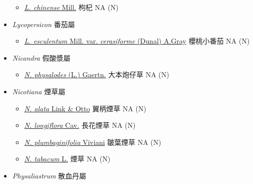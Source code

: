 \begin{itemize}
  \begin{itemize}
        \item[] \href{http://www.theplantlist.org/tpl1.1/search?q=Lycium+chinense}{\textit{L. chinense} Mill.}   枸杞   NA (N)
  \end{itemize}
 \item[] \textit{Lycopersicon} 番茄屬
                                
  \begin{itemize}
        \item[] \href{http://www.theplantlist.org/tpl1.1/search?q=Lycopersicon+esculentum+var.+cerasiforme}{\textit{L. esculentum} Mill. var. \textit{cerasiforme} (Dunal) A.Gray}   櫻桃小番茄   NA (N)
  \end{itemize}
 \item[] \textit{Nicandra} 假酸漿屬
                                
  \begin{itemize}
        \item[] \href{http://www.theplantlist.org/tpl1.1/search?q=Nicandra+physalodes}{\textit{N. physalodes} (L.) Gaertn.}   大本炮仔草   NA (N)
  \end{itemize}
 \item[] \textit{Nicotiana} 煙草屬
                                
  \begin{itemize}
        \item[] \href{http://www.theplantlist.org/tpl1.1/search?q=Nicotiana+alata}{\textit{N. alata} Link \& Otto}   翼柄煙草   NA (N)
        \item[] \href{http://www.theplantlist.org/tpl1.1/search?q=Nicotiana+longiflora}{\textit{N. longiflora} Cav.}   長花煙草   NA (N)
        \item[] \href{http://www.theplantlist.org/tpl1.1/search?q=Nicotiana+plumbaginifolia}{\textit{N. plumbaginifolia} Viviani}   皺葉煙草   NA (N)
        \item[] \href{http://www.theplantlist.org/tpl1.1/search?q=Nicotiana+tabacum}{\textit{N. tabacum} L.}   煙草   NA (N)
  \end{itemize}
 \item[] \textit{Physaliastrum} 散血丹屬
                                

\end{itemize}

